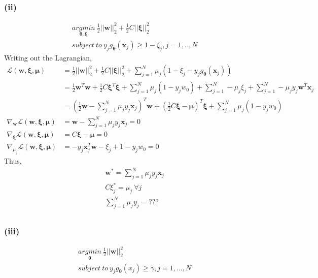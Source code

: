 \documentclass[11pt]{article}
\begin{document}
\subsubsection*{(ii)}
\begin{equation}
\begin{split}
&\underset{\pmb{\theta},\pmb{\xi}}{argmin}\ \frac{1}{2}||\pmb{w}||^2_2 + \frac{1}{2}C||\pmb{\xi}||^2_2\\
&subject\ to\ y_jg_{\pmb{\theta}}(\pmb{x}_j)\ge 1-\xi_j,j=1,..,N
\end{split}
\end{equation}
Writing out the Lagrangian, 
\begin{equation}
\begin{split}
\mathcal{L}(\pmb{w}, \pmb{\xi}, \pmb{\mu}) &= \frac{1}{2}||\pmb{w}||^2_2 + \frac{1}{2}C||\pmb{\xi}||^2_2 + \sum_{j=1}^{N}\mu_j(1-\xi_j-y_jg_{\pmb{\theta}}(\pmb{x}_j))\\
&=\frac{1}{2}\pmb{w}^T\pmb{w} + \frac{1}{2}C\pmb{\xi}^T\pmb{\xi} + \sum_{j=1}^{N}\mu_j(1-y_jw_0) + \sum_{j=1}^{N}-\mu_j\xi_j + \sum_{j=1}^{N}-\mu_jy_j\pmb{w}^T\pmb{x}_j\\
&=(\frac{1}{2}\pmb{w}-\sum_{j=1}^{N}\mu_jy_j\pmb{x}_j)^T\pmb{w} + (\frac{1}{2}C\pmb{\xi}-\pmb{\mu})^T\pmb{\xi} + \sum_{j=1}^{N}\mu_j(1-y_jw_0)\\
\nabla_{\pmb{w}}\mathcal{L}(\pmb{w}, \pmb{\xi}, \pmb{\mu}) &= \pmb{w}-\sum_{j=1}^{N}\mu_jy_j\pmb{x}_j = 0\\
\nabla_{\pmb{\xi}}\mathcal{L}(\pmb{w}, \pmb{\xi}, \pmb{\mu}) &= C\pmb{\xi}-\pmb{\mu} = 0\\
\nabla_{\mu_j}\mathcal{L}(\pmb{w}, \pmb{\xi}, \pmb{\mu}) &= -y_j\pmb{x}_j^T\pmb{w} - \xi_j + 1-y_jw_0 = 0
\end{split}
\end{equation}
Thus,
\begin{equation}
\begin{split}
&\pmb{w}^*=\sum_{j=1}^{N}\mu_jy_j\pmb{x}_j\\
&C\xi_j^*= \mu_j\ \forall j\\
&\sum_{j=1}^{N}\mu_jy_j = ???\\
\end{split}
\end{equation}

\subsubsection*{(iii)}
\begin{equation}
\begin{split}
&\underset{\pmb{\theta}}{argmin}\ \frac{1}{2}||\pmb{w}||^2_2 \\
&subject\ to\ y_jg_{\pmb{\theta}}(x_j)\ge \gamma,j=1,...,N
\end{split}
\end{equation}
\end{document}
